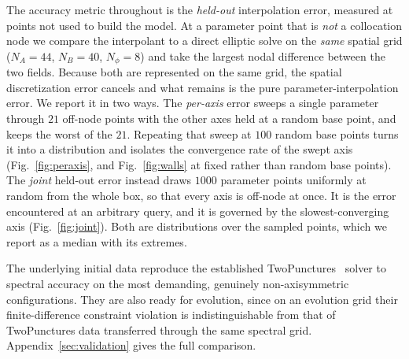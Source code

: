 \documentclass[
  aps,
  prd,
  twocolumn,
  10pt,
  amsmath,
  amssymb,
  nofootinbib,
  superscriptaddress,
  floatfix,
]{revtex4-2}
\begin{document}
\begin{table}[t]
  \caption{\label{tab:box}%
    \textbf{Parameter box and build configuration} shared by the two
    quasi-circular models (Sec.~\ref{sec:model}). Both models sample the same edges on
    the same spatial grid at the same level. The aligned-spin model varies only
    $\chi^{A}_{y}$ and $\chi^{B}_{y}$, and the general-spin model all six spin components. The
    momenta follow from the other parameters through the
    quasi-circularity condition (Sec.~\ref{sec:model:qc}).}
  
\end{table}

The accuracy metric throughout is the \emph{held-out} interpolation error, measured at points not used to build the model.
At a parameter point that is \emph{not} a collocation node we compare the interpolant to a direct elliptic solve on the \emph{same} spatial grid ($N_A=44$, $N_B=40$, $N_\phi=8$) and take the largest nodal difference between the two fields.
Because both are represented on the same grid, the spatial
discretization error cancels and what remains is the pure
parameter-interpolation error. We report it in two ways.
The \emph{per-axis} error sweeps a single parameter through $21$ off-node points with the other axes held at a random base point, and keeps the worst of the $21$.
Repeating that sweep at $100$ random base points turns it into a distribution and isolates the convergence rate of the swept axis (Fig.~\ref{fig:peraxis}, and Fig.~\ref{fig:walls} at fixed rather than random base points).
The \emph{joint} held-out error instead draws $1000$ parameter points uniformly at random from the whole box, so that every axis is off-node at once.
It is the error encountered at an arbitrary query, and it is governed by the slowest-converging axis (Fig.~\ref{fig:joint}).
Both are distributions over the sampled points,
which we report as a median with its extremes.

The underlying initial data reproduce the established
TwoPunctures~\cite{AnsorgBruegmannTichy2004} solver to spectral accuracy on the
most demanding, genuinely non-axisymmetric configurations.
They are also ready for evolution, since on an evolution grid their finite-difference constraint violation
is indistinguishable from that of TwoPunctures data transferred through the same spectral grid. Appendix~\ref{sec:validation} gives the full
comparison.
\end{document}

